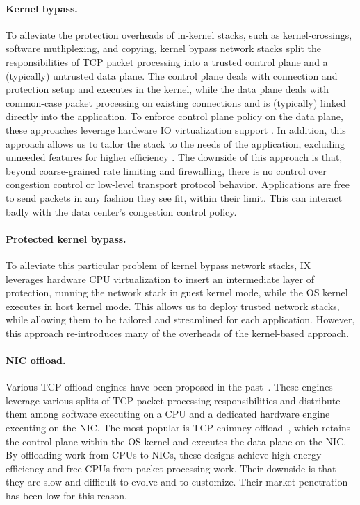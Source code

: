 \paragraph{Kernel bypass.} To alleviate the protection overheads of
in-kernel stacks, such as kernel-crossings, software mutliplexing, and
copying, kernel bypass network stacks split the responsibilities of
TCP packet processing into a trusted control plane and a (typically)
untrusted data plane. The control plane deals with connection and
protection setup and executes in the kernel, while the data plane
deals with common-case packet processing on existing connections and
is (typically) linked directly into the application. To enforce
control plane policy on the data plane, these approaches leverage
hardware IO virtualization support \cite{peter:arrakis, mtcp}. In
addition, this approach allows us to tailor the stack to the needs of
the application, excluding unneeded features for higher efficiency
\cite{sandstorm}. The downside of this approach is that, beyond
coarse-grained rate limiting and firewalling, there is no control over
congestion control or low-level transport protocol
behavior. Applications are free to send packets in any fashion they
see fit, within their limit. This can interact badly with the data
center's congestion control policy.

\paragraph{Protected kernel bypass.} To alleviate this particular
problem of kernel bypass network stacks, IX~\cite{belay:ix} leverages
hardware CPU virtualization to insert an intermediate layer of
protection, running the network stack in guest kernel mode, while the
OS kernel executes in host kernel mode. This allows us to deploy
trusted network stacks, while allowing them to be tailored and
streamlined for each application. However, this approach re-introduces
many of the overheads of the kernel-based approach.

\paragraph{NIC offload.} Various TCP offload engines have been
proposed in the past~\cite{chelsio_toe}. These engines leverage
various splits of TCP packet processing responsibilities and
distribute them among software executing on a CPU and a dedicated
hardware engine executing on the NIC. The most popular is TCP chimney
offload~\cite{chimney}, which retains the control plane within the OS
kernel and executes the data plane on the NIC. By offloading work from
CPUs to NICs, these designs achieve high energy-efficiency and free
CPUs from packet processing work. Their downside is that they are slow
and difficult to evolve and to customize. Their market penetration has
been low for this reason.

